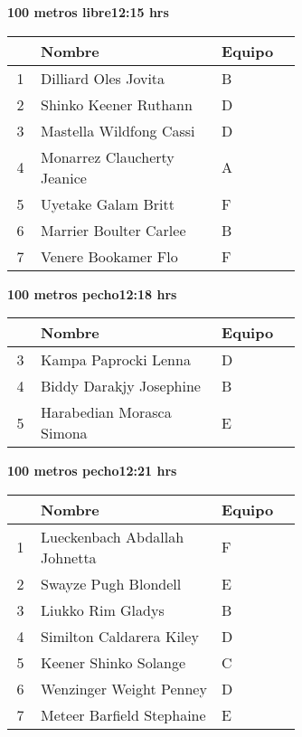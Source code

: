 \begin{minipage}{0.95\linewidth}
\begin{center}
\textbf{
100 metros libre\hspace{1cm}12:15 hrs}
\end{center}
\begin{tabular}{cp{0.63\linewidth}l}
\hline
& \textbf{Nombre} & \textbf{Equipo} \\ \hline
1 & Dilliard Oles Jovita & B \\ 
2 & Shinko Keener Ruthann & D \\ 
3 & Mastella Wildfong Cassi & D \\ 
4 & Monarrez Claucherty Jeanice & A \\ 
5 & Uyetake Galam Britt & F \\ 
6 & Marrier Boulter Carlee & B \\ 
7 & Venere Bookamer Flo & F \\ 
\end{tabular}
\end{minipage}
\begin{minipage}{0.95\linewidth}
\begin{center}
\textbf{
100 metros pecho\hspace{1cm}12:18 hrs}
\end{center}
\begin{tabular}{cp{0.63\linewidth}l}
\hline
& \textbf{Nombre} & \textbf{Equipo} \\ \hline
3 & Kampa Paprocki Lenna & D \\ 
4 & Biddy Darakjy Josephine & B \\ 
5 & Harabedian Morasca Simona & E \\ 
\end{tabular}
\end{minipage}
\begin{minipage}{0.95\linewidth}
\begin{center}
\textbf{
100 metros pecho\hspace{1cm}12:21 hrs}
\end{center}
\begin{tabular}{cp{0.63\linewidth}l}
\hline
& \textbf{Nombre} & \textbf{Equipo} \\ \hline
1 & Lueckenbach Abdallah Johnetta & F \\ 
2 & Swayze Pugh Blondell & E \\ 
3 & Liukko Rim Gladys & B \\ 
4 & Similton Caldarera Kiley & D \\ 
5 & Keener Shinko Solange & C \\ 
6 & Wenzinger Weight Penney & D \\ 
7 & Meteer Barfield Stephaine & E \\ 
\end{tabular}
\end{minipage}
